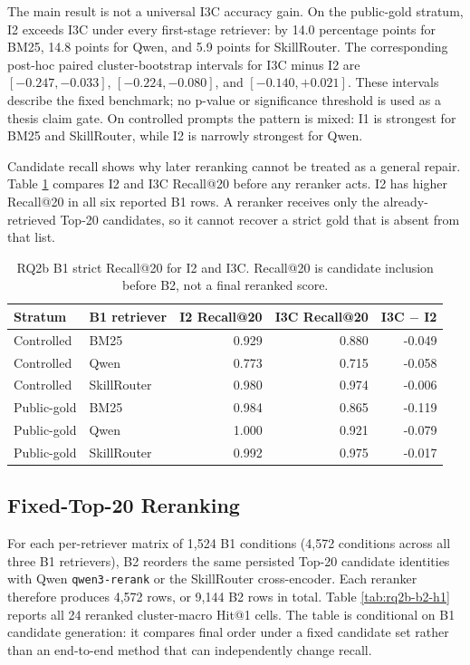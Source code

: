The main result is not a universal I3C accuracy gain. On the public-gold stratum, I2 exceeds I3C under every first-stage retriever: by 14.0 percentage points for BM25, 14.8 points for Qwen, and 5.9 points for SkillRouter. The corresponding post-hoc paired cluster-bootstrap intervals for I3C minus I2 are $[-0.247,-0.033]$, $[-0.224,-0.080]$, and $[-0.140,+0.021]$. These intervals describe the fixed benchmark; no p-value or significance threshold is used as a thesis claim gate. On controlled prompts the pattern is mixed: I1 is strongest for BM25 and SkillRouter, while I2 is narrowly strongest for Qwen.

Candidate recall shows why later reranking cannot be treated as a general repair. Table \ref{tab:rq2b-b1-recall} compares I2 and I3C Recall@20 before any reranker acts. I2 has higher Recall@20 in all six reported B1 rows. A reranker receives only the already-retrieved Top-20 candidates, so it cannot recover a strict gold that is absent from that list.

\begin{table}[H]
\centering
\scriptsize
\setlength{\tabcolsep}{3pt}
\begin{tabular}{llrrr}
\toprule
Stratum & B1 retriever & I2 Recall@20 & I3C Recall@20 & I3C $-$ I2 \\
\midrule
Controlled & BM25 & 0.929 & 0.880 & -0.049 \\
Controlled & Qwen & 0.773 & 0.715 & -0.058 \\
Controlled & SkillRouter & 0.980 & 0.974 & -0.006 \\
\midrule
Public-gold & BM25 & 0.984 & 0.865 & -0.119 \\
Public-gold & Qwen & 1.000 & 0.921 & -0.079 \\
Public-gold & SkillRouter & 0.992 & 0.975 & -0.017 \\
\bottomrule
\end{tabular}
\caption{RQ2b B1 strict Recall@20 for I2 and I3C. Recall@20 is candidate inclusion before B2, not a final reranked score.}
\label{tab:rq2b-b1-recall}
\end{table}

\subsection{Fixed-Top-20 Reranking}

For each per-retriever matrix of 1,524 B1 conditions (4,572 conditions across all three B1 retrievers), B2 reorders the same persisted Top-20 candidate identities with Qwen \texttt{qwen3-rerank} or the SkillRouter cross-encoder. Each reranker therefore produces 4,572 rows, or 9,144 B2 rows in total. Table \ref{tab:rq2b-b2-h1} reports all 24 reranked cluster-macro Hit@1 cells. The table is conditional on B1 candidate generation: it compares final order under a fixed candidate set rather than an end-to-end method that can independently change recall.

